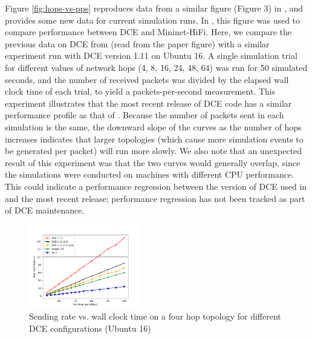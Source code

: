 \documentclass{sig-alternate}
\begin{document}
Figure \ref{fig:hops-vs-pps} reproduces data from a similar figure (Figure 3)
in \cite{Tazaki13}, and provides some new data for current simulation runs.
In \cite{Tazaki13}, this figure was used to compare performance between
DCE and Mininet-HiFi.  Here, we compare the previous data on DCE from
\cite{Tazaki13} (read from the paper figure) with a similar experiment run
with DCE version 1.11 on Ubuntu 16.  A single simulation trial for different
values of network hops (4, 8, 16, 24, 48, 64) was run for 50 simulated
seconds, and the number of received packets was divided by the elapsed
wall clock time of each trial, to yield a packets-per-second measurement.
This experiment illustrates that the most recent release of DCE code has a
similar performance profile as that of \cite{Tazaki13}.  Because the
number of packets sent in each simulation is the same, the downward
slope of the curves as the number of hops increases indicates that larger
topologies (which cause more simulation events to be generated per packet)
will run more slowly.  We also note that an unexpected result of this
experiment was that the two curves would generally overlap, since the
simulations were conducted on machines with different CPU performance.
This could indicate a performance regression between the version of DCE
used in \cite{Tazaki13} and the most recent release; performance regression
has not been tracked as part of DCE maintenance.

\begin{figure}[h!]
  \centering
    \includegraphics[width=0.43\textwidth]{figs/rate-vs-time.png}
  \caption{Sending rate vs. wall clock time on a four hop topology for different DCE configurations (Ubuntu 16)}
  \label{fig:rate-vs-time}
\end{figure}
\end{document}
